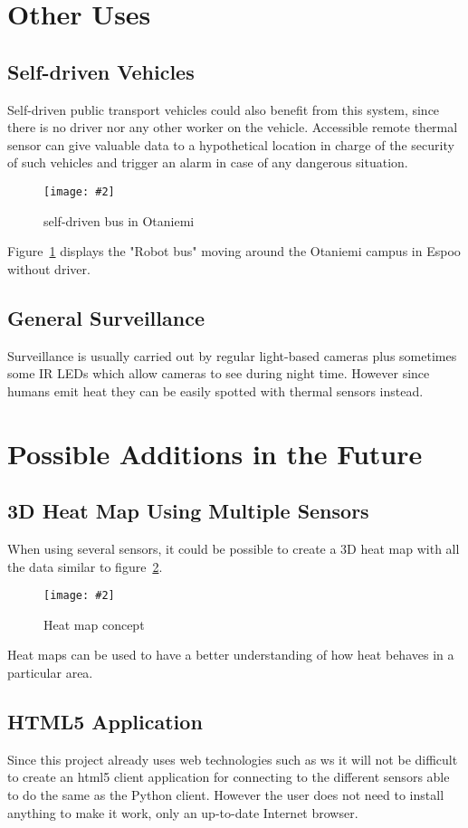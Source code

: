 \documentclass[hidelinks,11pt,a4paper,oneside,article]{memoir}
\newcommand{\putimage}[3][10] %
{
\begin{figure}[h]
	\centering
	\captionsetup{justification=centering}
	\texttt{[image: \#2]}
	\caption{#3}
	\label{fig:#2}
\end{figure}
}
\begin{document}
\section{Other Uses}
\subsection{Self-driven Vehicles}
Self-driven public transport vehicles could also benefit from this system, since there is no driver nor any other worker on the vehicle. Accessible remote thermal sensor can give valuable data to a hypothetical location in charge of the security of such vehicles and trigger an alarm in case of any dangerous situation.
    \clearpage
    \putimage{robo-bussi}{self-driven bus in Otaniemi}
    
Figure~\ref{fig:robo-bussi} displays the "Robot bus" moving around the Otaniemi campus in Espoo without driver.

\subsection{General Surveillance}
Surveillance is usually carried out by regular light-based cameras plus sometimes some IR LEDs which allow cameras to see during night time. However since humans emit heat they can be easily spotted with thermal sensors instead.

\section{Possible Additions in the Future}
\subsection*{3D Heat Map Using Multiple Sensors}
When using several sensors, it could be possible to create a 3D heat map with all the data similar to figure~\ref{fig:heatmap}.
    \clearpage
    \putimage[10]{heatmap}{Heat map concept}
    
Heat maps can be used to have a better understanding of how heat behaves in a particular area.

\subsection*{HTML5 Application}
Since this project already uses web technologies such as \gls{ws} it will not be difficult to create an \gls{html}5 client application for connecting to the different sensors able to do the same as the Python client. However the user does not need to install anything to make it work, only an up-to-date Internet browser.
\end{document}
